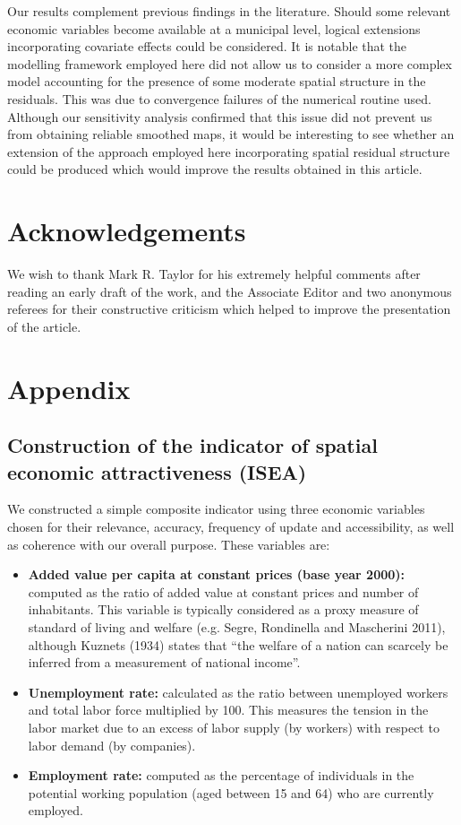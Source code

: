 \documentclass[12pt]{article}
\theoremstyle{definition}
\theoremstyle{plain}
\begin{document}
Our results complement previous findings in the literature. Should some relevant economic variables become available at a municipal level, logical extensions incorporating covariate effects could be considered. It is notable that the modelling framework employed here did not allow us to consider a more complex model accounting for the presence of some moderate spatial structure in the residuals. This was due to convergence failures of the numerical routine used. Although our sensitivity analysis confirmed that this issue did not prevent us from obtaining reliable smoothed maps, it would be interesting to see whether an extension of the approach employed here incorporating spatial residual structure could be produced which would improve the results obtained in this article.

\section*{Acknowledgements}

We wish to thank Mark R. Taylor for his extremely helpful comments after reading an early draft of the work, and the Associate Editor and two anonymous referees for their constructive criticism which helped to improve the presentation of the article.

\section*{Appendix \label{NEX}}

\subsection*{Construction of the indicator of spatial economic attractiveness (ISEA) \label{ISEA}}

We constructed a simple composite indicator using three economic variables chosen for their relevance, accuracy, frequency of update and accessibility, as well as coherence with our overall purpose. These variables are:

\begin{itemize}
\item \textbf{Added value per capita at constant prices (base year 2000):} computed as the ratio of added value at constant prices and number of inhabitants. This variable is typically considered as a proxy measure of standard of living and welfare (e.g. Segre, Rondinella and Mascherini 2011), although Kuznets (1934) states that ``the welfare of a nation can scarcely be inferred from a measurement of national income''. 

\item \textbf{Unemployment rate:} calculated as the ratio between unemployed workers and total labor force multiplied by 100. This measures the tension in the labor market due to an excess of labor supply (by workers) with respect to labor demand (by companies).

\item \textbf{Employment rate:} computed as the percentage of individuals in the potential working population (aged between 15 and 64) who are currently employed.
\end{itemize}
\end{document}
